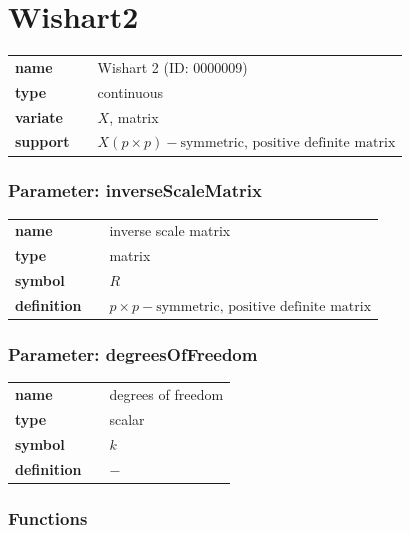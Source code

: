 \section*{Wishart2} 

  \bigskip 

\begin{tabular}{p{2cm}cl}
\textbf{name} & & Wishart 2 (ID: 0000009)\\ 
 
\textbf{type} & & continuous \\ 

\textbf{variate} & & $X$, matrix \\ 

\textbf{support} & & $X(p \times p) - \text{symmetric, positive definite matrix}$
\end{tabular}


\subsubsection*{Parameter: inverseScaleMatrix}

\noindent\begin{tabular}{p{2cm}cl}
\textbf{name} & & inverse scale matrix \\
\textbf{type} & & matrix \\
\textbf{symbol} & & $R$  \\
\textbf{definition} & & $p\times p - \text{symmetric, positive definite matrix}$
\end{tabular}
\subsubsection*{Parameter: degreesOfFreedom}

\noindent\begin{tabular}{p{2cm}cl}
\textbf{name} & & degrees of freedom \\
\textbf{type} & & scalar \\
\textbf{symbol} & & $k$  \\
\textbf{definition} & & $-$
\end{tabular}
\subsubsection*{Functions}

